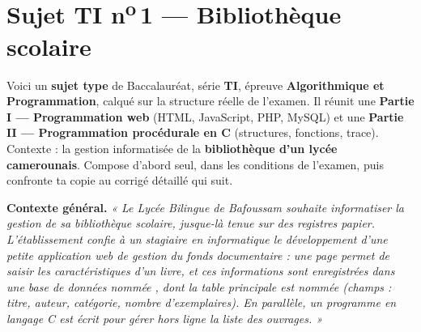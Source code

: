 \section{Sujet TI n\textsuperscript{o}\,1 — Bibliothèque scolaire}

\begin{synthese}
Voici un \textbf{sujet type} de Baccalauréat, série \textbf{TI}, épreuve
\textbf{Algorithmique et Programmation}, calqué sur la structure réelle de
l'examen. Il réunit une \textbf{Partie I — Programmation web} (HTML, JavaScript,
PHP, MySQL) et une \textbf{Partie II — Programmation procédurale en C}
(structures, fonctions, trace). Contexte : la gestion informatisée de la
\textbf{bibliothèque d'un lycée camerounais}. Compose d'abord seul, dans les
conditions de l'examen, puis confronte ta copie au corrigé détaillé qui suit.
\end{synthese}

\begin{center}
\end{center}

\medskip
\noindent\textbf{Contexte général.} \emph{« Le Lycée Bilingue de Bafoussam
souhaite informatiser la gestion de sa bibliothèque scolaire, jusque-là tenue
sur des registres papier. L'établissement confie à un stagiaire en informatique
le développement d'une petite application web de gestion du fonds documentaire :
une page permet de saisir les caractéristiques d'un livre, et ces informations
sont enregistrées dans une base de données nommée , dont la
table principale est nommée  (champs : titre, auteur, catégorie,
nombre d'exemplaires). En parallèle, un programme en langage C est écrit pour
gérer hors ligne la liste des ouvrages. »}

